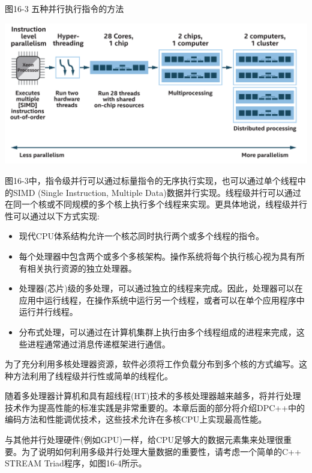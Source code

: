 \hspace*{\fill} \par %
图16-3 五种并行执行指令的方法
\begin{center}
	\includegraphics[width=1.0\textwidth]{content/chapter-16/images/4}
\end{center}

图16-3中，指令级并行可以通过标量指令的无序执行实现，也可以通过单个线程中的SIMD (Single Instruction, Multiple Data)数据并行实现。线程级并行可以通过在同一个核或不同规模的多个核上执行多个线程来实现。更具体地说，线程级并行性可以通过以下方式实现:\par

\begin{itemize}
	\item 现代CPU体系结构允许一个核芯同时执行两个或多个线程的指令。
	\item 每个处理器中包含两个或多个多核架构。操作系统将每个执行核心视为具有所有相关执行资源的独立处理器。
	\item 处理器(芯片)级的多处理，可以通过独立的线程来完成。因此，处理器可以在应用中运行线程，在操作系统中运行另一个线程，或者可以在单个应用程序中运行并行线程。
	\item 分布式处理，可以通过在计算机集群上执行由多个线程组成的进程来完成，这些进程通常通过消息传递框架进行通信。
\end{itemize}

为了充分利用多核处理器资源，软件必须将工作负载分布到多个核的方式编写。这种方法利用了线程级并行性或简单的线程化。\par

随着多处理器计算机和具有超线程(HT)技术的多核处理器越来越多，将并行处理技术作为提高性能的标准实践是非常重要的。本章后面的部分将介绍DPC++中的编码方法和性能调优技术，这些技术允许在多核CPU上实现最高性能。\par

与其他并行处理硬件(例如GPU)一样，给CPU足够大的数据元素集来处理很重要。为了说明如何利用多级并行处理大量数据的重要性，请考虑一个简单的C++ STREAM Triad程序，如图16-4所示。\par

